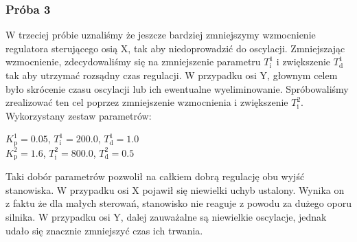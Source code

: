 
\subsubsection{Próba 3}
W trzeciej próbie uznaliśmy że jeszcze bardziej zmniejszymy wzmocnienie regulatora sterującego osią X, tak 
aby niedoprowadzić do oscylacji. Zmniejszając wzmocnienie, zdecydowaliśmy się na zmniejszenie parametru 
$T^{\num{1}}_{\mathrm{i}}$ i zwiększenie $T^{\num{1}}_{\mathrm{d}}$ tak aby utrzymać rozsądny czas regulacji.
W przypadku osi Y, głownym celem było skrócenie czasu oscylacji lub ich ewentualne wyeliminowanie. Spróbowaliśmy 
zrealizować ten cel poprzez zmniejszenie wzmocnienia i zwiększenie $T^{\num{2}}_{\mathrm{i}}$.\\

Wykorzystany zestaw parametrów:

\begin{center}
    $K^{\num{1}}_{\mathrm{p}} = \num{0.05}$, $T^{\num{1}}_{\mathrm{i}} = \num{200.0}$, $T^{\num{1}}_{\mathrm{d}} = \num{1.0}$ \\
    $K^{\num{2}}_{\mathrm{p}} = \num{1.6}$, $T^{\num{2}}_{\mathrm{i}} = \num{800.0}$, $T^{\num{2}}_{\mathrm{d}} = \num{0.5}$ \\
\end{center}
\vspace{1cm}

Taki dobór parametrów pozwolił na całkiem dobrą regulację obu wyjść stanowiska. W przypadku osi X
pojawił się niewielki uchyb ustalony. Wynika on z faktu że dla małych sterowań, stanowisko nie reaguje
z powodu za dużego oporu silnika. W przypadku osi Y, dalej zauważalne są niewielkie oscylacje, jednak 
udało się znacznie zmniejszyć czas ich trwania.


